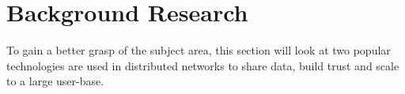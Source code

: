 \chapter{Background Research}

To gain a better grasp of the subject area, this section will look at two popular technologies are used in distributed networks to share data, build trust and scale to a large user-base.


